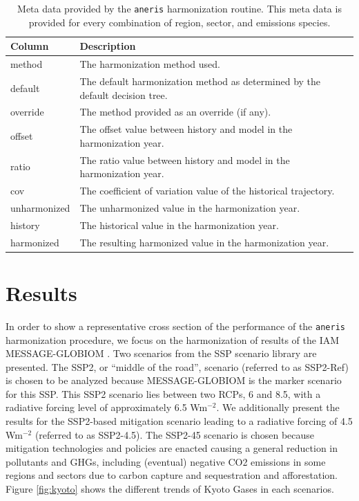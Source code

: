 \documentclass[review]{elsarticle}
\newcommand{\code}[1]{\lstinline[basicstyle=\ttfamily\color{black}]|#1|}
\begin{document}
\begin{table}[]
\centering
\caption{Meta data provided by the \code{aneris} harmonization routine. This meta data is provided for every combination of region, sector, and emissions species.}
\label{tab:metadata}
\begin{tabular}{|p{2cm}|p{8cm}|}
\hline
\textbf{Column}       & \textbf{Description}                                      \\
\hline
\hline
method       & The harmonization method used.                                               \\
\hline
default      & The default harmonization method as determined by the default decision tree. \\
\hline
override     & The method provided as an override (if any).                                 \\
\hline
offset       & The offset value between history and model in the harmonization year.        \\
\hline
ratio        & The ratio value between history and model in the harmonization year.         \\
\hline
cov          & The coefficient of variation value of the historical trajectory.                           \\
\hline
unharmonized & The unharmonized value in the harmonization year.                            \\
\hline
history      & The historical value in the harmonization year.                             \\
\hline
harmonized   & The resulting harmonized value in the harmonization year.\\
\hline
\end{tabular}
\end{table}
\section{Results}\label{sec:results}

In order to show a representative cross section of the performance of the
\code{aneris} harmonization procedure, we focus on the harmonization of results
of the IAM MESSAGE-GLOBIOM \cite{fricko_marker_2017}. Two scenarios from the SSP
scenario library \cite{Riahi2017153,Rao2017346} are presented. The SSP2, or
``middle of the road'', scenario (referred to as SSP2-Ref) is chosen to be
analyzed because MESSAGE-GLOBIOM is the marker scenario for this SSP. This SSP2
scenario lies between two RCPs, 6 and 8.5, with a radiative forcing level of
approximately 6.5 Wm$^{-2}$. We additionally present the results for the
SSP2-based mitigation scenario leading to a radiative forcing of 4.5 Wm$^{-2}$
(referred to as SSP2-4.5). The SSP2-45 scenario is chosen because mitigation
technologies and policies are enacted causing a general reduction in pollutants
and GHGs, including (eventual) negative CO2 emissions in some regions and
sectors due to carbon capture and sequestration and afforestation. Figure
\ref{fig:kyoto} shows the different trends of Kyoto Gases in each scenarios.
\end{document}
